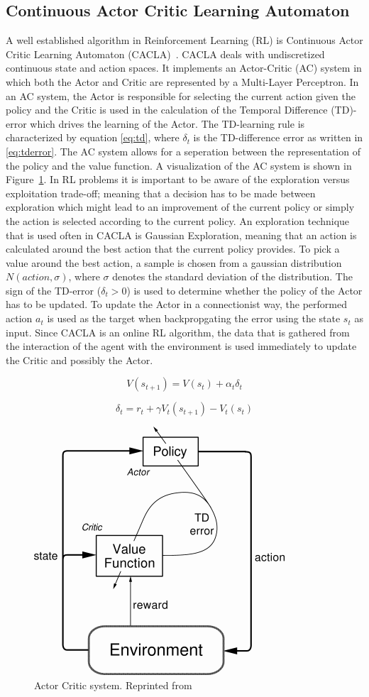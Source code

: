 
\subsection{Continuous Actor Critic Learning Automaton}
A well established algorithm in Reinforcement Learning (RL) is Continuous Actor Critic Learning Automaton (CACLA)~\cite{van2007reinforcement}. CACLA deals with undiscretized continuous state and action spaces. It implements an Actor-Critic (AC) system in which both the Actor and Critic are represented by a Multi-Layer Perceptron. In an AC system, the Actor is responsible for selecting the current action given the policy and the Critic is used in the calculation of the Temporal Difference (TD)-error which drives the learning of the Actor. The TD-learning rule is characterized by equation \eqref{eq:td}, where $\delta_{t}$ is the TD-difference error as written in \eqref{eq:tderror}. The AC system allows for a seperation between the representation of the policy and the value function. A visualization of the AC system is shown in Figure~\ref{fig:actorcriticsystem}. In RL problems it is important to be aware of the exploration versus exploitation trade-off; meaning that a decision has to be made between exploration which might lead to an improvement of the current policy or simply the action is selected according to the current policy. An exploration technique that is used often in CACLA is Gaussian Exploration, meaning that an action is calculated around the best action that the current policy provides. To pick a value around the best action, a sample is chosen from a gaussian distribution $N(action, \sigma)$, where $\sigma$ denotes the standard deviation of the distribution. The sign of the TD-error ($\delta_{t} > 0$) is used to determine whether the policy of the Actor has to be updated. To update the Actor in a connectionist way, the performed action $a_{t}$ is used as the target when backpropgating the error using the state $s_{t}$ as input. Since CACLA is an online RL algorithm, the data that is gathered from the interaction of the agent with the environment is used immediately to update the Critic and possibly the Actor. 

\begin{equation}
\label{eq:td}
V(s_{t+1}) = V(s_t) + \alpha_{t} \delta_{t}
\end{equation}

\begin{equation}
\label{eq:tderror}
\delta_{t} = r_{t} + \gamma V_{t}(s_{t+1}) - V_{t}(s_{t})
\end{equation}

\begin{figure}[t]
 \centering 
    \includegraphics[width = 0.35\columnwidth]{figs/actorcritic.png}
 \caption{Actor Critic system. Reprinted from~\cite{sutton1998reinforcement}}
\label{fig:actorcriticsystem}
\end{figure}



